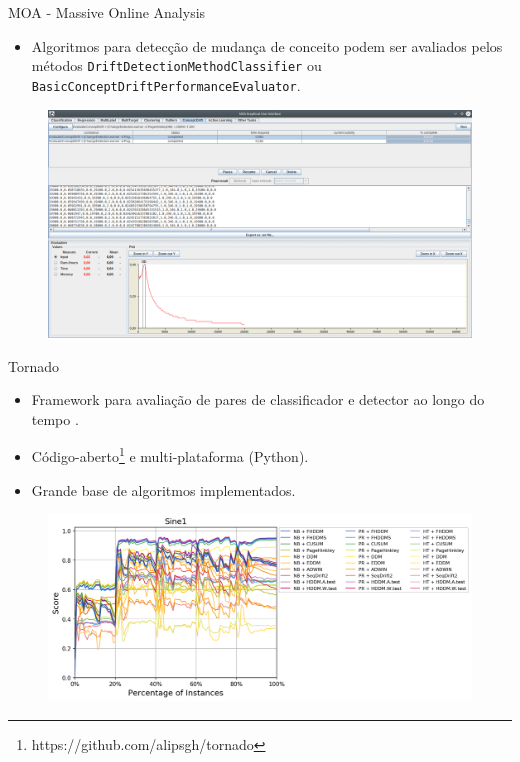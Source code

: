 \documentclass[10pt]{beamer}
\begin{document}
\begin{frame}{MOA - Massive Online Analysis}
    \begin{itemize}
        \item Algoritmos para detecção de mudança de conceito podem ser avaliados pelos métodos \texttt{DriftDetectionMethodClassifier} ou \texttt{BasicConceptDriftPerformanceEvaluator}.
    \end{itemize}

    \begin{figure}[H]
        \begin{center}
            \includegraphics[scale=0.25]{imagens/moa_avaliacao_cd.png}
        \end{center}
    \end{figure}
\end{frame}

\begin{frame}{Tornado}
    \begin{itemize}
        \item Framework para avaliação de pares de classificador e detector ao longo do tempo \cite{Pesaranghader:Tornado}.
        \item Código-aberto\footnote{https://github.com/alipsgh/tornado} e multi-plataforma (Python).
        \item Grande base de algoritmos implementados.
    \end{itemize}

    \begin{figure}[H]
        \begin{center}
            \includegraphics[scale=0.4]{imagens/tornado_out2.png}
        \end{center}
    \end{figure}
\end{frame}
\end{document}
